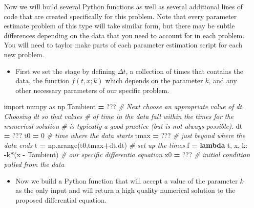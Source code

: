\documentclass[
]{book}
\newenvironment{Shaded}{\begin{snugshade}}{\end{snugshade}}
\newcommand{\CommentTok}[1]{\textcolor[rgb]{0.56,0.35,0.01}{\textit{#1}}}
\newcommand{\DecValTok}[1]{\textcolor[rgb]{0.00,0.00,0.81}{#1}}
\newcommand{\ImportTok}[1]{#1}
\newcommand{\KeywordTok}[1]{\textcolor[rgb]{0.13,0.29,0.53}{\textbf{#1}}}
\newcommand{\NormalTok}[1]{#1}
\newcommand{\OperatorTok}[1]{\textcolor[rgb]{0.81,0.36,0.00}{\textbf{#1}}}
\providecommand{\tightlist}{%
  \setlength{\itemsep}{0pt}\setlength{\parskip}{0pt}}
\theoremstyle{definition}
\theoremstyle{definition}
\theoremstyle{definition}
\theoremstyle{remark}
\begin{document}
Now we will build several Python functions as well as several additional lines of code that are created specifically for this problem. Note that every parameter estimate problem of this type will take similar form, but there may be subtle differences depending on the data that you need to account for in each problem. You will need to taylor make parts of each parameter estimation script for each new problem.

\begin{itemize}
\tightlist
\item
  First we set the stage by defining \(\Delta t\), a collection of times that contains the data, the function \(f(t,x; k)\) which depends on the parameter \(k\), and any other necessary parameters of our specific problem.
\end{itemize}

\begin{Shaded}
\begin{Highlighting}[]
\ImportTok{import}\NormalTok{ numpy }\ImportTok{as}\NormalTok{ np}
\NormalTok{Tambient }\OperatorTok{=}\NormalTok{ ???}
\CommentTok{\# Next choose an appropriate value of dt.  Choosing dt so that values }
\CommentTok{\# of time in the data fall within the times for the numerical solution}
\CommentTok{\# is typically a good practice (but is not always possible).}
\NormalTok{dt }\OperatorTok{=}\NormalTok{ ??? }
\NormalTok{t0 }\OperatorTok{=} \DecValTok{0} \CommentTok{\# time where the data starts}
\NormalTok{tmax }\OperatorTok{=}\NormalTok{ ??? }\CommentTok{\# just beyond where the data ends}
\NormalTok{t }\OperatorTok{=}\NormalTok{ np.arange(t0,tmax}\OperatorTok{+}\NormalTok{dt,dt) }\CommentTok{\# set up the times }
\NormalTok{f }\OperatorTok{=} \KeywordTok{lambda}\NormalTok{ t, x, k: }\OperatorTok{{-}}\NormalTok{k}\OperatorTok{*}\NormalTok{(x }\OperatorTok{{-}}\NormalTok{ Tambient) }\CommentTok{\# our specific differentia equation}
\NormalTok{x0 }\OperatorTok{=}\NormalTok{ ??? }\CommentTok{\# initial condition pulled from the data}
\end{Highlighting}
\end{Shaded}

\begin{itemize}
\tightlist
\item
  Now we build a Python function that will accept a value of the parameter \(k\) as the only input and will return a high quality numerical solution to the proposed differential equation.
\end{itemize}
\end{document}
